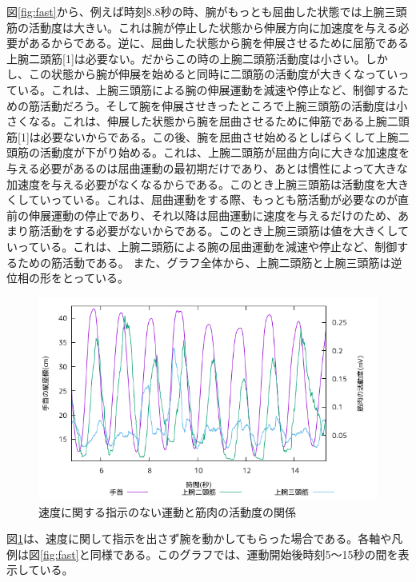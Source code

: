 \documentclass{jsarticle}
\begin{document}
図\ref{fig:fast}から、例えば時刻8.8秒の時、腕がもっとも屈曲した状態では上腕三頭筋の活動度は大きい。これは腕が停止した状態から伸展方向に加速度を与える必要があるからである。逆に、屈曲した状態から腕を伸展させるために屈筋である上腕二頭筋[1]は必要ない。だからこの時の上腕二頭筋活動度は小さい。しかし、この状態から腕が伸展を始めると同時に二頭筋の活動度が大きくなっていっている。これは、上腕三頭筋による腕の伸展運動を減速や停止など、制御するための筋活動だろう。そして腕を伸展させきったところで上腕三頭筋の活動度は小さくなる。これは、伸展した状態から腕を屈曲させるために伸筋である上腕二頭筋[1]は必要ないからである。この後、腕を屈曲させ始めるとしばらくして上腕二頭筋の活動度が下がり始める。これは、上腕二頭筋が屈曲方向に大きな加速度を与える必要があるのは屈曲運動の最初期だけであり、あとは慣性によって大きな加速度を与える必要がなくなるからである。このとき上腕三頭筋は活動度を大きくしていっている。これは、屈曲運動をする際、もっとも筋活動が必要なのが直前の伸展運動の停止であり、それ以降は屈曲運動に速度を与えるだけのため、あまり筋活動をする必要がないからである。このとき上腕三頭筋は値を大きくしていっている。これは、上腕二頭筋による腕の屈曲運動を減速や停止など、制御するための筋活動である。
また、グラフ全体から、上腕二頭筋と上腕三頭筋は逆位相の形をとっている。

\begin{figure}[b]
  \begin{center}
    \includegraphics[width=15cm]{images/s1proto.png}
  \end{center}
  \caption{速度に関する指示のない運動と筋肉の活動度の関係}
  \label{fig:slow}
\end{figure}
図\ref{fig:slow}は、速度に関して指示を出さず腕を動かしてもらった場合である。各軸や凡例は図\ref{fig:fast}と同様である。このグラフでは、運動開始後時刻5〜15秒の間を表示している。
\end{document}
